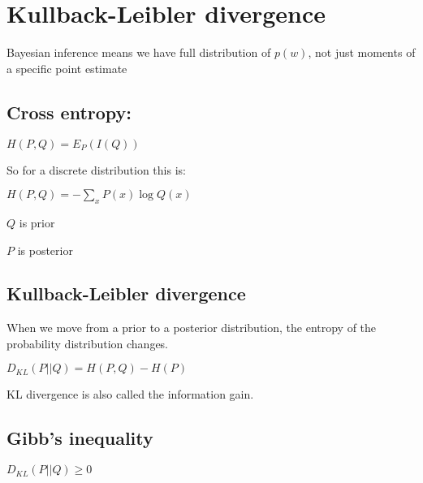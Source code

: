 
\section{Kullback-Leibler divergence}

Bayesian inference means we have full distribution of \(p(w)\), not just moments of a specific point estimate

\subsection{Cross entropy:}

\(H(P,Q)=E_P(I(Q))\)

So for a discrete distribution this is:

\(H(P,Q)=-\sum_x P(x)\log Q(x)\)

\(Q\) is prior

\(P\) is posterior

\subsection{Kullback-Leibler divergence}

When we move from a prior to a posterior distribution, the entropy of the probability distribution changes.

\(D_{KL}(P||Q)=H(P,Q)-H(P)\)

KL divergence is also called the information gain.

\subsection{Gibb's inequality}

\(D_{KL}(P||Q)\ge 0\)

